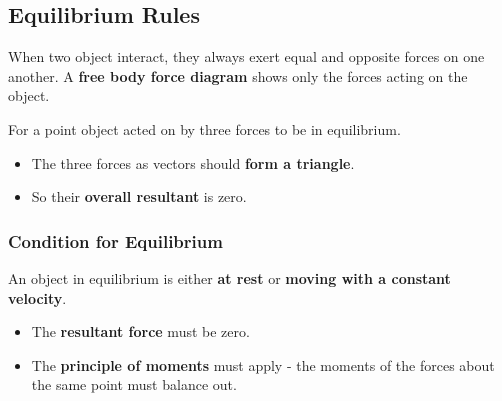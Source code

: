 \subsection{Equilibrium Rules}

When two object interact, they always exert equal and opposite forces on one another. A \textbf{free body force diagram} shows only the forces acting on the object.

For a point object acted on by three forces to be in equilibrium.
\begin{itemize}
    \item The three forces as vectors should \textbf{form a triangle}.
    \item So their \textbf{overall resultant} is zero.
\end{itemize}

\subsubsection*{Condition for Equilibrium}

An object in equilibrium is either \textbf{at rest} or \textbf{moving with a constant velocity}.
\begin{itemize}
    \item The \textbf{resultant force} must be zero.
    \item The \textbf{principle of moments} must apply - the moments of the forces about the same point must balance out.
\end{itemize}
